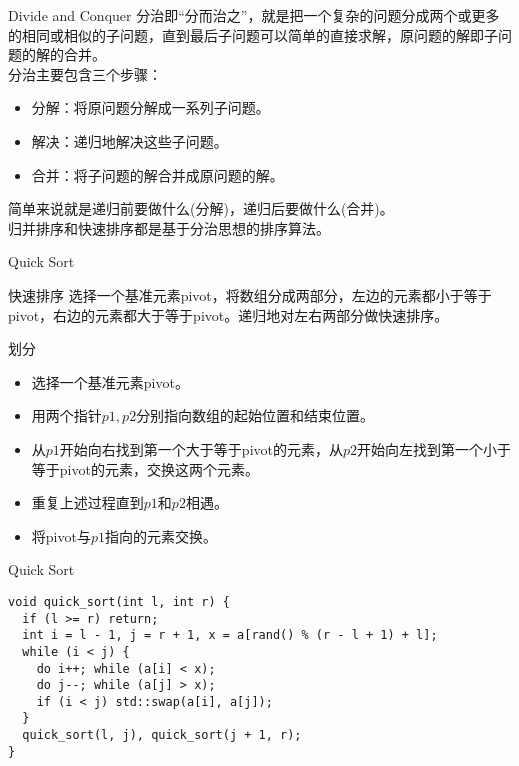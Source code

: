 \documentclass{ldr-simple-gray}
\begin{document}
  \begin{frame}{Divide and Conquer}
      分治即“分而治之”，就是把一个复杂的问题分成两个或更多的相同或相似的子问题，直到最后子问题可以简单的直接求解，原问题的解即子问题的解的合并。
      \\

      分治主要包含三个步骤：
      \begin{itemize}
        \item 分解：将原问题分解成一系列子问题。
        \item 解决：递归地解决这些子问题。
        \item 合并：将子问题的解合并成原问题的解。
      \end{itemize}

      简单来说就是递归前要做什么(分解)，递归后要做什么(合并)。
      \\

      归并排序和快速排序都是基于分治思想的排序算法。
    \end{frame}

  \begin{frame}{Quick Sort}
    \begin{block}{快速排序}
      选择一个基准元素pivot，将数组分成两部分，左边的元素都小于等于pivot，右边的元素都大于等于pivot。递归地对左右两部分做快速排序。
    \end{block}
    \begin{block}{划分}
      \begin{itemize}
        \item 选择一个基准元素pivot。
        \item 用两个指针$p1,p2$分别指向数组的起始位置和结束位置。
        \item 从$p1$开始向右找到第一个大于等于pivot的元素，从$p2$开始向左找到第一个小于等于pivot的元素，交换这两个元素。
        \item 重复上述过程直到$p1$和$p2$相遇。
        \item 将pivot与$p1$指向的元素交换。
      \end{itemize}
    \end{block}
  \end{frame}

  \begin{frame}[fragile]{Quick Sort}
    \begin{verbatim}
void quick_sort(int l, int r) {
  if (l >= r) return;
  int i = l - 1, j = r + 1, x = a[rand() % (r - l + 1) + l];
  while (i < j) {
    do i++; while (a[i] < x);
    do j--; while (a[j] > x);
    if (i < j) std::swap(a[i], a[j]);
  }
  quick_sort(l, j), quick_sort(j + 1, r);
}
    \end{verbatim}
  \end{frame}
\end{document}
